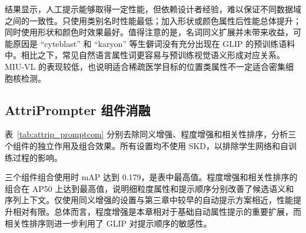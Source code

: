 结果显示，人工提示能够取得一定性能，但依赖设计者经验，难以保证不同数据域之间的一致性。只使用类别名时性能最低；加入形状或颜色属性后性能总体提升；同时使用形状和颜色时效果最好。值得注意的是，名词同义扩展并未带来收益，可能原因是 ``cyteblast'' 和 ``karyon'' 等生僻词没有充分出现在 GLIP 的预训练语料中。相比之下，常见自然语言属性词更容易与预训练视觉语义形成对应关系。MIU-VL 的表现较低，也说明适合稀疏医学目标的位置类属性不一定适合密集细胞核检测。

\subsection{AttriPrompter 组件消融}

表~\ref{tab:attrip_promptcom} 分别去除同义增强、程度增强和相关性排序，分析三个组件的独立作用及组合效果。所有设置均不使用 SKD，以排除学生网络和自训练过程的影响。

\begin{table}[t]
\caption{AttriPrompter 组件消融实验。该实验不使用 SKD。最优结果以粗体表示。}
\label{tab:attrip_promptcom}
\begin{center}
\end{center}
\vskip -0.15in
\end{table}

三个组件组合使用时 mAP 达到 0.179，是表中最高值。程度增强和相关性排序的组合在 AP50 上达到最高值，说明细粒度属性和提示顺序分别改善了候选语义和序列上下文。仅使用同义增强的设置与第三章中较早的自动提示方案相近，性能提升相对有限。总体而言，程度增强是本章相对于基础自动属性提示的重要扩展，而相关性排序则进一步利用了 GLIP 对提示顺序的敏感性。

